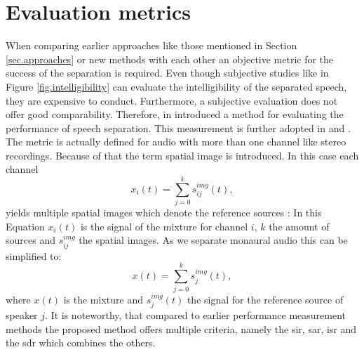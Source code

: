 \section{Evaluation metrics}\label{sec.method-selection}
When comparing earlier approaches like those mentioned in Section \ref{sec.approaches}  or new methods with each other an objective metric for the success of the separation is required. Even though subjective studies like in Figure \ref{fig.intelligibility} can evaluate the intelligibility of the separated speech, they are expensive to conduct. Furthermore, a subjective evaluation does not offer good comparability.
Therefore, in \citeyear{Vincent2006} \citeauthor{Vincent2006} introduced a method for evaluating the performance of speech separation. This measurement is further adopted in \cite{Vincent2007} and \cite{Vincent2012}. 
The metric is actually defined for audio with more than one channel like stereo recordings. Because of that the term spatial image is introduced. In this case each channel
\begin{equation}
	x_i(t)=\sum_{j=0}^{k} s_{ij}^{img}(t),
\end{equation}
yields multiple spatial images which denote the reference sources \cite[p. 3]{Vincent2007}:
In this Equation $x_i(t)$ is the signal of the mixture for channel $i$, $k$ the amount of sources and $s_{ij}^{img}$ the spatial images. As we separate monaural audio this can be simplified to:
\begin{equation}
	x(t)=\sum_{j=0}^{k} s_{j}^{img}(t),
	\label{eq.metric.ref-source}
\end{equation}
where $x(t)$ is the mixture and $s_{j}^{img}(t)$ the signal for the reference source of speaker $j$.
It is noteworthy, that compared to earlier performance measurement methods the proposed method offers multiple criteria, namely the \gls{sir}, \gls{sar}, \gls{isr} and the \gls{sdr} which combines the others.


